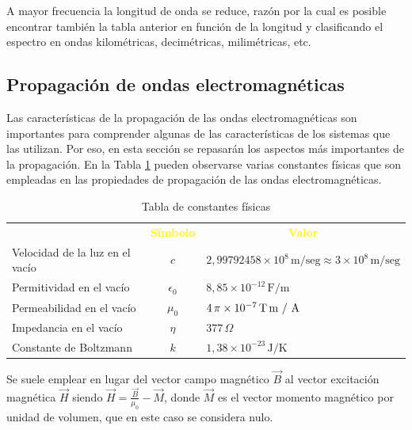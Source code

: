 A mayor frecuencia la longitud de onda se reduce, raz\'on por la cual es posible encontrar tambi\'en la tabla anterior en funci\'on de la longitud y clasificando el espectro en ondas kilom\'etricas, decim\'etricas, milim\'etricas, etc.  	  	 


\subsection{Propagaci\'on de ondas electromagn\'eticas}

Las caracter\'isticas de la propagaci\'on de las ondas electromagn\'eticas son importantes para comprender algunas de las caracter\'isticas de los sistemas que las utilizan. Por eso, en esta secci\'on se repasar\'an los aspectos m\'as importantes de la propagaci\'on. En la Tabla \ref{tab:06.constantes.fisicas} pueden observarse varias constantes f\'isicas que son empleadas en las propiedades de propagaci\'on de las ondas electromagn\'eticas.


\begin{table}[!h]
  \centering
  \caption{Tabla de constantes f\'isicas}
  \begin{tabular}{lcl}  \rowcolor{blue!50!black}
    \multicolumn{1}{c}{\textcolor{yellow}{\bf Constante}}
&   \multicolumn{1}{c}{\textcolor{yellow}{\bf S\'imbolo}}
&   \multicolumn{1}{c}{\textcolor{yellow}{\bf Valor}} \\

Velocidad de la luz en el vac\'io & $c$ & $2,99792458 \times 10^8\,\text{m/seg} \approx 3 \times 10^8\,\text{m/seg}$ \\ \hline
Permitividad en el vac\'io & $\epsilon_0$ & $8,85 \times 10^{-12} \,\text{F/m}$ \\ \hline
Permeabilidad en el vac\'io & $\mu_0$ & $ 4\,\pi \times 10^{-7} \,\text{T\,m / A}$ \\ \hline
Impedancia en el vac\'io & $\eta$ & $ 377\,\Omega$ \\ \hline
Constante de Boltzmann & $k$ &  $1,38 \times 10^{-23} \,\text{J/K}$ \\ \hline
  \end{tabular}

  \label{tab:06.constantes.fisicas}
\end{table}


Se suele emplear en lugar del vector campo magn\'etico  $\vec{B}$ al vector excitaci\'on magn\'etica $\vec{H}$ siendo 
$\displaystyle \vec{H} = \frac{\vec{B}}{\mu_0} - \vec{M}$,
donde $\vec{M}$ es el vector momento magn\'etico por unidad de volumen, que en este caso se considera nulo.

